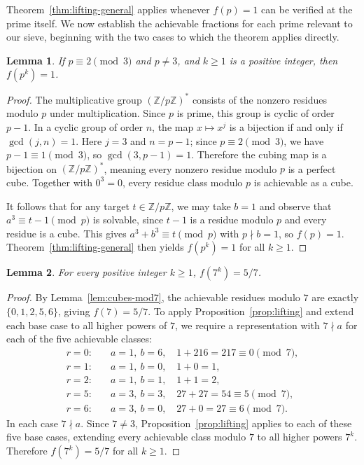 \documentclass[12pt]{amsart}
\newtheorem{lemma}{Lemma}
\theoremstyle{definition}
\theoremstyle{remark}
\begin{document}
Theorem~\ref{thm:lifting-general} applies whenever $f(p) = 1$ can be
verified at the prime itself. We now establish the achievable fractions
for each prime relevant to our sieve, beginning with the two cases to
which the theorem applies directly.

\begin{lemma}\label{lem:f-p2mod3}
If $p \equiv 2 \pmod{3}$ and $p \ne 3$, and $k \ge 1$ is a positive 
integer, then $f(p^k) = 1$.
\end{lemma}

\begin{proof}
The multiplicative group $(\mathbb{Z}/p\mathbb{Z})^*$ consists of the
nonzero residues modulo $p$ under multiplication. Since $p$ is prime,
this group is cyclic of order $p - 1$. In a cyclic group of order $n$,
the map $x \mapsto x^j$ is a bijection if and only if $\gcd(j, n) = 1$.
Here $j = 3$ and $n = p - 1$; since $p \equiv 2 \pmod{3}$, we have
$p - 1 \equiv 1 \pmod{3}$, so $\gcd(3, p-1) = 1$. Therefore the cubing
map is a bijection on $(\mathbb{Z}/p\mathbb{Z})^*$, meaning every nonzero
residue modulo $p$ is a perfect cube. Together with $0^3 = 0$, every
residue class modulo $p$ is achievable as a cube.

It follows that for any target $t \in \mathbb{Z}/p\mathbb{Z}$, we may
take $b = 1$ and observe that $a^3 \equiv t - 1 \pmod{p}$ is solvable,
since $t - 1$ is a residue modulo $p$ and every residue is a cube. This
gives $a^3 + b^3 \equiv t \pmod{p}$ with $p \nmid b = 1$, so $f(p) = 1$.
Theorem~\ref{thm:lifting-general} then yields $f(p^k) = 1$ for all
$k \ge 1$.
\end{proof}

\begin{lemma}\label{lem:f-7}
For every positive integer $k \ge 1$, $f(7^k) = 5/7$.
\end{lemma}

\begin{proof}
By Lemma~\ref{lem:cubes-mod7}, the achievable residues modulo $7$ are 
exactly $\{0,1,2,5,6\}$, giving $f(7) = 5/7$. To apply 
Proposition~\ref{prop:lifting} and extend each base case to all higher 
powers of $7$, we require a representation with $7 \nmid a$ for each 
of the five achievable classes:
\begin{align*}
r = 0: &\quad a = 1,\ b = 6,\quad 1 + 216 = 217 \equiv 0 \pmod{7},\\
r = 1: &\quad a = 1,\ b = 0,\quad 1 + 0 = 1,\\
r = 2: &\quad a = 1,\ b = 1,\quad 1 + 1 = 2,\\
r = 5: &\quad a = 3,\ b = 3,\quad 27 + 27 = 54 \equiv 5 \pmod{7},\\
r = 6: &\quad a = 3,\ b = 0,\quad 27 + 0 = 27 \equiv 6 \pmod{7}.
\end{align*}
In each case $7 \nmid a$. Since $7 \ne 3$, 
Proposition~\ref{prop:lifting} applies to each of these five base 
cases, extending every achievable class modulo $7$ to all higher powers 
$7^k$. Therefore $f(7^k) = 5/7$ for all $k \ge 1$.
\end{proof}
\end{document}
